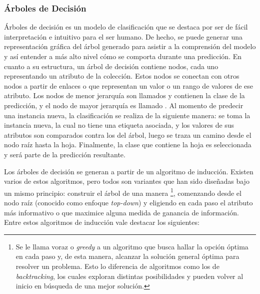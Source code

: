 \subsubsection{Árboles de Decisión}

Árboles de decisión es un modelo de clasificación que se destaca por ser de
fácil interpretación e intuitivo para el ser humano. De hecho, se puede generar
una representación gráfica del árbol generado para asistir a la comprensión del
modelo y así entender a más alto nivel cómo se comporta durante una predicción.
En cuanto a su estructura, un árbol de decisión contiene nodos, cada uno
representando un atributo de la colección. Estos nodos se conectan con otros
nodos a partir de enlaces o  que representan un valor o un rango
de valores de ese atributo.  Los nodos de menor jerarquía son llamados
 y contienen la clase de la predicción, y el nodo de mayor
jerarquía es llamado . Al momento de predecir una instancia
nueva, la clasificación se realiza de la siguiente manera:  se toma la instancia
nueva, la cual no tiene una etiqueta asociada, y los valores de sus atributos
son comparados contra los del árbol, luego se traza un camino desde el nodo raíz
hasta la hoja. Finalmente, la clase que contiene la hoja es seleccionada y será
parte de la predicción resultante.

Los árboles de decisión se generan a partir de un algoritmo de inducción.
Existen varios de estos algoritmos, pero todos son variantes que han sido
diseñadas bajo un mismo principio: construir  el árbol de una manera
\footnote{Se le llama voraz o \textit{greedy} a un algoritmo que
	busca hallar la opción óptima en cada paso y, de esta manera, alcanzar la
	solución general óptima para resolver un problema.  Esto lo diferencia de
	algoritmos como los de \textit{backtracking}, los cuales exploran distintas
	posibilidades y pueden volver al inicio en búsqueda de una mejor solución.},
comenzando desde el nodo raíz (conocido como enfoque \textit{top-down}) y
eligiendo en cada paso el atributo más informativo o que maximice alguna medida
de ganancia de información. Entre estos algoritmos de inducción vale destacar
los siguientes:

